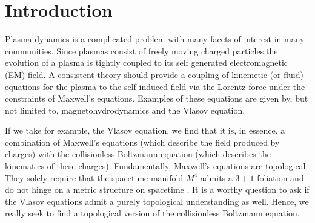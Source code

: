 \documentclass[conf]{new-aiaa}
\begin{document}
%

\section{Introduction}
Plasma dynamics is a complicated problem with many facets of interest in many communities. Since plasmas consist of freely moving charged particles,the evolution of a plasma is tightly coupled to its self generated electromagnetic (EM) field. A consistent theory should provide a coupling of kinemetic (or fluid) equations for the plasma to the self induced field via the Lorentz force under the constraints of Maxwell's equations. Examples of these equations are given by, but not limited to, magnetohydrodynamics and the Vlasov equation. 

If we take for example, the Vlasov equation, we find that it is, in essence, a combination of Maxwell's equations (which describe the field produced by charges) with the collisionless Boltzmann equation (which describes the kinematics of these charges). Fundamentally, Maxwell's equations are topological. They solely require that the spacetime manifold $M^4$ admits a $3+1$-foliation and do not hinge on a metric structure on spacetime \cite{delphenich_axioms_2005, hehl_foundations_2003}. It is a worthy question to ask if the Vlasov equations admit a purely topological understanding as well. Hence, we really seek to find a topological version of the collisionless Boltzmann equation.
\end{document}
